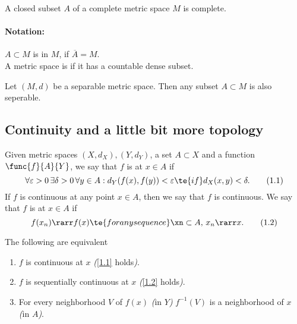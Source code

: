 \begin{lem}\label{i.10}
    A closed subset $A$ of a complete metric space $M$ is complete.
\end{lem}

\paragraph{Notation:}
$A\subset M$ is  in $M$, if $\overline{A}=M$.\\
A metric space is  if it has a countable dense subset.

\begin{lem}\label{i.11}
Let $(M,d)$ be a separable metric space. Then any subset $A\subset M$ is also seperable.
\end{lem}

\subsection{Continuity and a little bit more topology}

\begin{definition}\label{i.12}
    Given metric spaces $(X,d_X),(Y,d_Y)$, a set $A\subset X$ and a function $\func{f}{A}{Y}$, we say that $f$ is  at $x\in A$ if
    \[\forall\varepsilon>0\,\exists\delta>0\,\forall y\in A: d_Y(f(x),f(y))<\varepsilon\te{ if }d_X(x,y)<\delta.\label{1.1}\tag{1.1}\]
    If $f$ is continuous at any point $x\in A$, then we say that $f$ is continuous.
    We say that $f$ is  at $x\in A$ if
    \[f(x_n)\rarr f(x)\te{ for any sequence }\xn\subset A,\,x_n\rarr x.\label{1.2}\tag{1.2}\]
\end{definition}

\begin{lem}\label{i.13}
    The following are equivalent
    \begin{enumerate}[label=\alph*)]
        \item $f$ is continuous at $x$ \emph{(}\eqref{1.1} holds\emph{)}.\label{1.13.a}
        \item $f$ is sequentially continuous at $x$ \emph{(}\eqref{1.2} holds\emph{)}.\label{1.13.b}
        \item For every neighborhood $V$ of $f(x)$ \emph{(}in $Y$\emph{)} $f^{-1}(V)$ is a neighborhood of $x$ \emph{(}in $A$\emph{)}.\label{1.13.c}
    \end{enumerate}
\end{lem}

